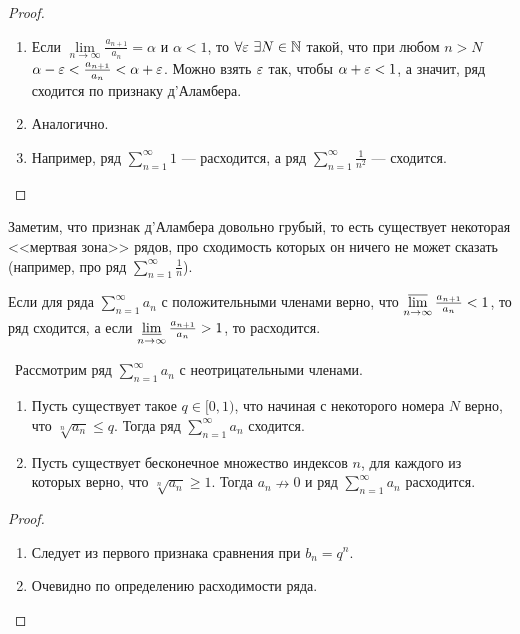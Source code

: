 \begin{proof}
	\ 
	\begin{enumerate}
		\item 	Если $\lim\limits_{n\rightarrow\infty} \frac{a_{n+1}}{a_n} = \alpha$ и $\alpha < 1$, то $\forall \varepsilon \ \exists N \in \mathbb{N}$ такой, что при любом $n > N$ $\alpha-\varepsilon<\frac{a_{n+1}}{a_n} < \alpha+\varepsilon$. Можно взять $\varepsilon$ так, чтобы $\alpha+\varepsilon <1$, а значит, ряд сходится по признаку д'Аламбера.
		\item Аналогично.
		\item Например, ряд $\sum\limits_{n=1}^{\infty} 1$ --- расходится, а ряд $\sum\limits_{n=1}^{\infty} \frac{1}{n^2}$ --- сходится. 

	\end{enumerate}
\end{proof}
Заметим, что признак д'Аламбера довольно грубый, то есть существует некоторая <<мертвая зона>> рядов, про сходимость которых он ничего не может сказать (например, про ряд  $\sum\limits_{n=1}^{\infty} \frac{1}{n}$).

\begin{Consequence}
	Если для ряда $\sum\limits_{n=1}^{\infty} a_n$ с положительными членами верно, что $\varlimsup\limits_{n\rightarrow \infty} \frac{a_{n+1}}{a_{n}} < 1$, то ряд сходится, а если $\varliminf\limits_{n \rightarrow \infty} \frac{a_{n+1}}{a_{n}} > 1$, то расходится.
\end{Consequence}

\begin{Test}\ 
Рассмотрим ряд $\sum\limits_{n=1}^{\infty} a_n$ с неотрицательными членами.
	\begin{enumerate}
		\item 	Пусть существует такое $q \in [0, 1)$, что начиная с некоторого номера $N$ верно, что $\sqrt[n]{{{a_n}}} \leqslant q$. Тогда ряд $\sum\limits_{n=1}^{\infty} a_n$ сходится.
		\item 	Пусть существует бесконечное множество индексов $n$, для каждого из которых верно, что  $\sqrt[n]{{{a_n}}} \geqslant 1$. Тогда $a_n \nrightarrow 0$ и ряд $\sum\limits_{n=1}^{\infty} a_n $ расходится.
	\end{enumerate}
\end{Test}

\begin{proof}
	\ 
	\begin{enumerate}
		\item 	Следует из первого признака сравнения при $b_n = q^n$. 
		\item Очевидно по определению расходимости ряда.
	\end{enumerate}
\end{proof}


